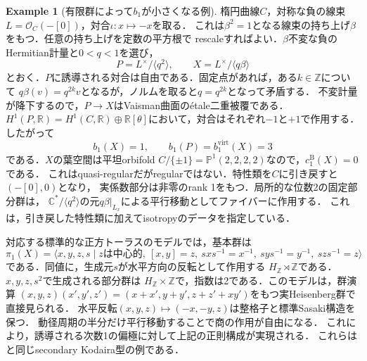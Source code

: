 \documentclass[12pt]{amsart}
\theoremstyle{definition}
\newtheorem{eg}[thm]{Example}
\theoremstyle{remark}
\numberwithin{equation}{section}
\newcommand{\cO}{\mathcal{O}}
\newcommand{\R}{\mathbb{R}}
\newcommand{\Z}{\mathbb{Z}}
\newcommand{\C}{\mathbb{C}}
\newcommand{\mP}{\mathbb{P}}
\newcommand{\bas}{\mathrm{B}}
\newcommand{\virt}{\mathrm{virt}}
\begin{document}
\begin{eg}[有限群によって$b_1$が小さくなる例]\label{eg:secondary}
楕円曲線$C$，対称な負の線束$L=\cO_C(-[0])$，対合$\iota:x\mapsto-x$を取る．
これは$\beta^2=1$となる線束の持ち上げ$\beta$をもつ．任意の持ち上げを定数の平方根で
rescaleすればよい．$\beta$不変な負のHermitian計量と$0<q<1$を選び，
\begin{equation}\label{eq:secondary}
P=L^{\times}/\langle q^2\rangle,
\qquad X=L^{\times}/\langle q\beta\rangle
\end{equation}
とおく．$P$に誘導される対合は自由である．固定点があれば，ある$k\in\Z$について
$q\beta(v)=q^{2k}v$となるが，ノルムを取ると$q=q^{2k}$となって矛盾する．
不変計量が降下するので，$P\to X$はVaisman曲面の\'etale二重被覆である．
$H^1(P,\R)=H^1(C,\R)\oplus\R[\theta]$において，対合はそれぞれ$-1$と$+1$で作用する．
したがって
\begin{equation}\label{eq:secondarynumbers}
b_1(X)=1,\qquad b_1(P)=b_1^{\virt}(X)=3
\end{equation}
である．$X$の葉空間は平坦orbifold
$C/\{\pm1\}=\mP^1(2,2,2,2)$なので，$c_1^{\bas}(X)=0$である．
これはquasi-regularだがregularではない．特性類を$C$に引き戻すと$(-[0],0)$となり，
実係数部分は非零のrank 1をもつ．局所的な位数2の固定部分群は，
$\C^*/\langle q^2\rangle$の元$q\beta|_{L_x}$による平行移動としてファイバーに作用する．
これは，引き戻した特性類に加えてisotropyのデータを指定している．

対応する標準的な正方トーラスのモデルでは，基本群は
\[
\pi_1(X)=\langle x,y,z,s\mid z\text{は中心的},\ [x,y]=z,
\ sxs^{-1}=x^{-1},\ sys^{-1}=y^{-1},\ szs^{-1}=z\rangle
\]
である．同値に，生成元$s$が水平方向の反転として作用する
$H_{\Z}\rtimes\Z$である．$x,y,z,s^2$で生成される部分群は
$H_{\Z}\times\Z$で，指数は2である．このモデルは，群演算
$(x,y,z)(x',y',z')=(x+x',y+y',z+z'+xy')$をもつ実Heisenberg群で直接見られる．
水平反転$(x,y,z)\mapsto(-x,-y,z)$は整格子と標準Sasaki構造を保つ．
動径周期の半分だけ平行移動することで商の作用が自由になる．
これにより，誘導される次数1の偏極に対して上記の正則構成が実現される．
これらは\cite[Example 7.3]{Istrati}と同じsecondary Kodaira型の例である．
\end{eg}
\end{document}
